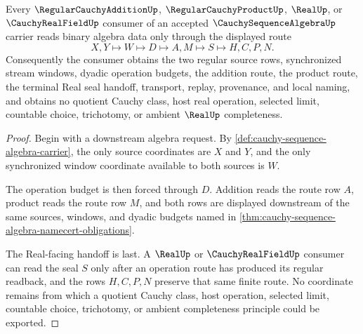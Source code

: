 \begin{theorem}
\label{thm:cauchy-sequence-algebra-operation-route}
Every $\RegularCauchyAdditionUp$, $\RegularCauchyProductUp$, $\RealUp$, or $\CauchyRealFieldUp$ consumer of an accepted $\CauchySequenceAlgebraUp$ carrier reads binary algebra data only through the displayed route
$$
X,Y \longmapsto W \longmapsto D \longmapsto A,M \longmapsto S \longmapsto H,C,P,N .
$$
Consequently the consumer obtains the two regular source rows, synchronized stream windows, dyadic operation budgets, the addition route, the product route, the terminal Real seal handoff, transport, replay, provenance, and local naming, and obtains no quotient Cauchy class, host real operation, selected limit, countable choice, trichotomy, or ambient $\RealUp$ completeness.
\end{theorem}
\begin{proof}
Begin with a downstream algebra request. By \autoref{def:cauchy-sequence-algebra-carrier}, the only source coordinates are $X$ and $Y$, and the only synchronized window coordinate available to both sources is $W$.

The operation budget is then forced through $D$. Addition reads the route row $A$, product reads the route row $M$, and both rows are displayed downstream of the same sources, windows, and dyadic budgets named in \autoref{thm:cauchy-sequence-algebra-namecert-obligations}.

The Real-facing handoff is last. A $\RealUp$ or $\CauchyRealFieldUp$ consumer can read the seal $S$ only after an operation route has produced its regular readback, and the rows $H,C,P,N$ preserve that same finite route. No coordinate remains from which a quotient Cauchy class, host operation, selected limit, countable choice, trichotomy, or ambient completeness principle could be exported.
\end{proof}

